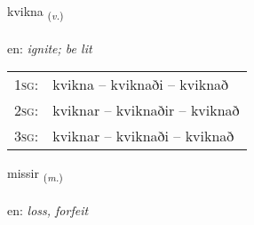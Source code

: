 \documentclass[frontgrid, backgrid]{flacards}\usepackage[]{graphicx}\usepackage[]{xcolor}
\begin{document}
\renewcommand{\flhead}{\vskip5pt \fboxsep=0pt {\small\bfseries\footnotesize Sagnorð | Verb}}
\renewcommand{\fcfoot}{\vskip5pt \fboxsep=0pt \hspace{2pt}{\small\bfseries\footnotesize 3K}}

\renewcommand{\blhead}{\vskip5pt {\small\bfseries\footnotesize Sagnorð | Verb }}
\renewcommand{\bcfoot}{\vskip5pt \hspace{2pt}{\small\bfseries\footnotesize 3K}}


{kvikna \small{\textsubscript{(\textit{v.})}} \\[1ex] %
\textphonetic{[kʰvɪhkna]} \\
en: \emph{ignite; be lit} \\  [2ex]
\renewcommand*{\arraystretch}{0.8}
\begin{tabular}{p{1cm}l}
\textsc{1sg}: & kvikna -- kviknaði -- kviknað \\ 
\textsc{2sg}: & kviknar -- kviknaðir -- kviknað \\ 
\textsc{3sg}: & kviknar -- kviknaði -- kviknað \\ 
\end{tabular}
}

\renewcommand{\flhead}{\vskip5pt \fboxsep=0pt {\small\bfseries\footnotesize Nafnorð | Noun}}
\renewcommand{\fcfoot}{\vskip5pt \fboxsep=0pt \hspace{2pt}{\small\bfseries\footnotesize 3K}}

\renewcommand{\blhead}{\vskip5pt {\small\bfseries\footnotesize Nafnorð | Noun }}
\renewcommand{\bcfoot}{\vskip5pt \hspace{2pt}{\small\bfseries\footnotesize 3K}}


{missir \small{\textsubscript{(\textit{m.})}} \\[1ex] %
\textphonetic{[mɪsɪr]} \\
en: \emph{loss, forfeit} \\  [2ex]
\renewcommand*{\arraystretch}{0.8}
}
\end{document}
